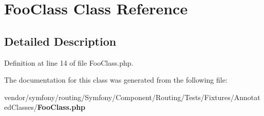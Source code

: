 \section{Foo\+Class Class Reference}
\label{class_symfony_1_1_component_1_1_routing_1_1_tests_1_1_fixtures_1_1_annotated_classes_1_1_foo_class}


\subsection{Detailed Description}


Definition at line 14 of file Foo\+Class.\+php.



The documentation for this class was generated from the following file\+:\begin{DoxyCompactItemize}
\item 
vendor/symfony/routing/\+Symfony/\+Component/\+Routing/\+Tests/\+Fixtures/\+Annotated\+Classes/{\bf Foo\+Class.\+php}\end{DoxyCompactItemize}
